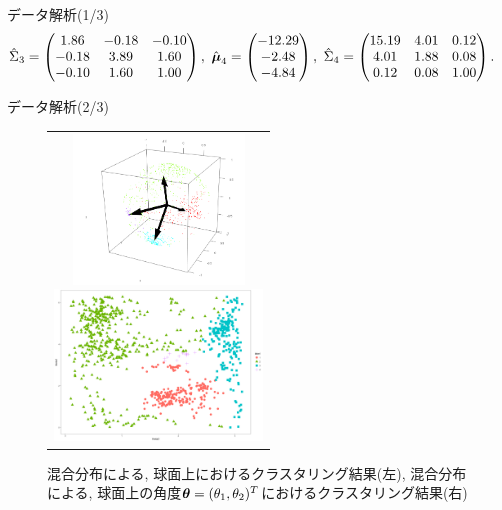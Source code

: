 \documentclass[dvipdfmx]{beamer} %
\newcommand{\bm}[1]{\mbox{\boldmath $#1$}}
\begin{document}
\begin{frame}{データ解析(1/3)}
\begin{equation*}
\begin{split}
&\hat \Sigma_3 = \begin{pmatrix}  1.86  & -0.18 &  -0.10 \\-0.18 & 3.89 & 1.60 \\  -0.10 & 1.60 & 1.00 \\ \end{pmatrix},\ 
\hat{\bm \mu}_4 = \begin{pmatrix} -12.29   \\ -2.48 \\ -4.84 \\ \end{pmatrix},\ 
\hat \Sigma_4 = \begin{pmatrix} 15.19 & 4.01 &  0.12 \\ 4.01 & 1.88 & 0.08 \\ 0.12 & 0.08 &1.00 \\ \end{pmatrix}.
\end{split}
\end{equation*}
\normalsize
\end{frame}


\begin{frame}{データ解析(2/3)}

\vspace{-1zh}
\begin{figure}[H]
\begin{tabular}{c}

\begin{minipage}{0.5\hsize}
\begin{center}
\includegraphics[clip,height= 40mm]{data/cluster_3d.png}
\end{center}
\end{minipage}

\begin{minipage}{0.5\hsize}
\begin{center}
\includegraphics[clip,height= 40mm]{data/cluster_4.png}
\end{center}
\end{minipage}

\end{tabular}
\label{fig2}
\caption{混合分布による, 球面上におけるクラスタリング結果(左), 混合分布による, 球面上の角度$\bm \theta = (\theta_1, \theta_2)^T$におけるクラスタリング結果(右)}
\end{figure}
\end{frame}
\end{document}
